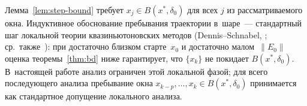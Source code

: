 \begin{remark}
\label{rem:trajectory-confinement}
Лемма~\ref{lem:step-bound} требует $x_j \in B(x^*,\delta_0)$ для всех
$j$ из рассматриваемого окна. Индуктивное обоснование пребывания
траектории в~шаре~--- стандартный шаг локальной теории
квазиньютоновских методов (Dennis--Schnabel,
\cite[Th.~8.2.2]{dennis1996}; ср.~также~\cite[\S 6.4]{bfgs}): при
достаточно близком старте~$x_0$ и достаточно малом~$\|E_0\|$ оценка
теоремы~\ref{thm:bd} ниже гарантирует, что $\{x_k\}$ не покидает
$B(x^*,\delta_0)$. В~настоящей работе анализ ограничен этой локальной
фазой; для всего последующего анализа пребывание окна
$x_{k-p},\ldots,x_k\in B(x^*,\delta_0)$ принимается как стандартное
допущение локального анализа.
\end{remark}


